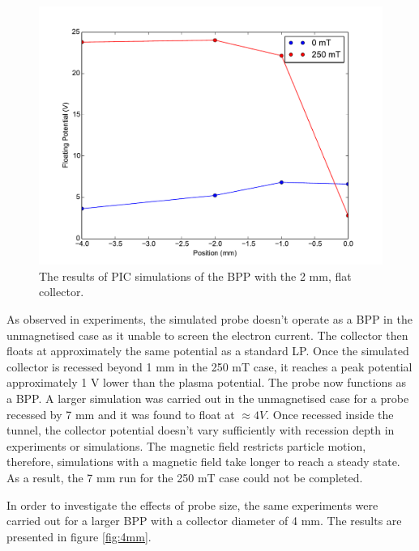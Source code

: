 \begin{figure}[H]
\centering
\includegraphics[width=1.0\textwidth]{sim_data.pdf}
\caption{The results of PIC simulations of the BPP with the 2 mm, flat collector. }
\label{fig:sim_results}
\end{figure}

As observed in experiments, the simulated probe doesn't operate as a BPP in the unmagnetised case as it unable to screen the electron current. The collector then floats at approximately the same potential as a  standard LP. Once the simulated collector is recessed beyond 1 mm in the 250 mT case, it reaches a peak potential approximately 1 V lower than the plasma potential. The probe now functions as a BPP. A larger simulation was carried out in the unmagnetised case for a probe recessed by 7 mm and it was found to float at $\approx 4 V$. Once recessed inside the tunnel, the collector potential doesn't vary sufficiently with recession depth in experiments or simulations. The magnetic field restricts particle motion, therefore, simulations with a magnetic field take longer to reach a steady state. As a result, the 7 mm run for the 250 mT case could not be completed.


In order to investigate the effects of probe size, the same experiments were carried out for a larger BPP with a collector diameter of 4 mm. The results are presented in figure \ref{fig:4mm}. 

%
%
%



